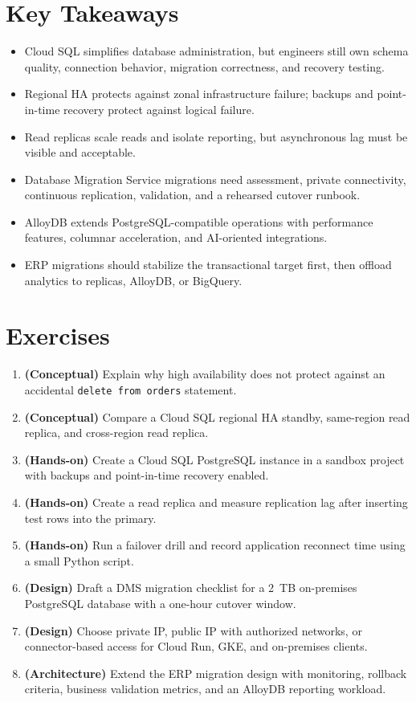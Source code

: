 \section*{Key Takeaways}
\begin{itemize}
    \item Cloud SQL simplifies database administration, but engineers still own schema quality, connection behavior, migration correctness, and recovery testing.
    \item Regional HA protects against zonal infrastructure failure; backups and point-in-time recovery protect against logical failure.
    \item Read replicas scale reads and isolate reporting, but asynchronous lag must be visible and acceptable.
    \item Database Migration Service migrations need assessment, private connectivity, continuous replication, validation, and a rehearsed cutover runbook.
    \item AlloyDB extends PostgreSQL-compatible operations with performance features, columnar acceleration, and AI-oriented integrations.
    \item ERP migrations should stabilize the transactional target first, then offload analytics to replicas, AlloyDB, or BigQuery.
\end{itemize}

\section{Exercises}
\begin{enumerate}
    \item \textbf{(Conceptual)} Explain why high availability does not protect against an accidental \texttt{delete from orders} statement.
    \item \textbf{(Conceptual)} Compare a Cloud SQL regional HA standby, same-region read replica, and cross-region read replica.
    \item \textbf{(Hands-on)} Create a Cloud SQL PostgreSQL instance in a sandbox project with backups and point-in-time recovery enabled.
    \item \textbf{(Hands-on)} Create a read replica and measure replication lag after inserting test rows into the primary.
    \item \textbf{(Hands-on)} Run a failover drill and record application reconnect time using a small Python script.
    \item \textbf{(Design)} Draft a DMS migration checklist for a 2~TB on-premises PostgreSQL database with a one-hour cutover window.
    \item \textbf{(Design)} Choose private IP, public IP with authorized networks, or connector-based access for Cloud Run, GKE, and on-premises clients.
    \item \textbf{(Architecture)} Extend the ERP migration design with monitoring, rollback criteria, business validation metrics, and an AlloyDB reporting workload.
\end{enumerate}

